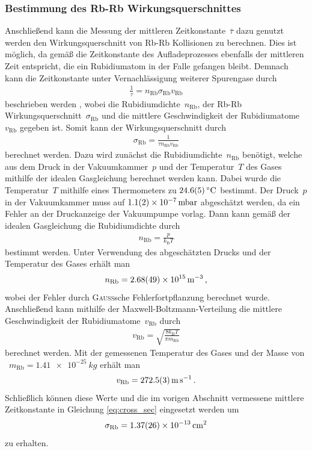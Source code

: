 \documentclass[11pt, a4paper]{article}
\numberwithin{equation}{section}
\begin{document}
\subsubsection{Bestimmung des Rb-Rb Wirkungsquerschnittes}
Anschließend kann die Messung der mittleren Zeitkonstante~$\bar{\tau}$ dazu genutzt werden den Wirkungsquerschnitt von Rb-Rb Kollisionen zu berechnen.
Dies ist möglich, da gemäß \cite{wieman} die Zeitkonstante des Aufladeprozesses ebenfalls der mittleren Zeit entspricht, die ein Rubidiumatom in der Falle gefangen bleibt.
Demnach kann die Zeitkonstante unter Vernachlässigung weiterer Spurengase durch 
\begin{align*}
	\frac{1}{\tau} = n_\mathrm{Rb}  \sigma_\mathrm{Rb}  v_\mathrm{Rb}
\end{align*}
beschrieben werden \cite{wieman}, wobei die Rubidiumdichte~$n_\mathrm{Rb}$, der Rb-Rb Wirkungsquerschnitt~$\sigma_\mathrm{Rb}$ und die mittlere Geschwindigkeit der Rubidiumatome~$v_\mathrm{Rb}$ gegeben ist.
Somit kann der Wirkungsquerschnitt durch
\begin{align}
	\sigma_\mathrm{Rb} = \frac{1}{\tau n_\mathrm{Rb} v_\mathrm{Rb}}
	\label{eq:cross_sec}
\end{align}
berechnet werden.
Dazu wird zunächst die Rubidiumdichte~$n_\mathrm{Rb}$ benötigt, welche aus dem Druck in der Vakuumkammer~$p$ und der Temperatur~$T$ des Gases mithilfe der idealen Gasgleichung berechnet werden kann.
Dabei wurde die Temperatur~$T$ mithilfe eines Thermometers zu $\SI{24.6 +- 0.5}{\degreeCelsius}$ bestimmt.
Der Druck~$p$ in der Vakuumkammer muss auf $\SI{1.1 +- 0.2e-7}{mbar}$ abgeschätzt werden, da ein Fehler an der Druckanzeige der Vakuumpumpe vorlag.
Dann kann gemäß der idealen Gasgleichung die Rubidiumdichte durch
\begin{align*}
	n_\mathrm{Rb} = \frac{p}{k_\mathrm{B} T}
\end{align*}
bestimmt werden.
Unter Verwendung des abgeschätzten Drucks und der Temperatur des Gases erhält man
\begin{align*}
	n_\mathrm{Rb} = \SI{2.68 +- 0.49e15}{\per\meter\cubed} \, \text{,}
\end{align*}
wobei der Fehler durch \textsc{Gauß}sche Fehlerfortpflanzung berechnet wurde.
Anschließend kann mithilfe der Maxwell-Boltzmann-Verteilung die mittlere Geschwindigkeit der Rubidiumatome~$v_\mathrm{Rb}$ durch
\begin{align*}
	v_\mathrm{Rb} = \sqrt{\frac{8 k_\mathrm{B} T}{\pi m_\mathrm{Rb}}} 
\end{align*}
berechnet werden.
Mit der gemessenen Temperatur des Gases und der Masse von ~$m_\mathrm{Rb} = \SI{1.41e-25}{kg}$ \cite{handbook_spectroscopic_data} erhält man
\begin{align*}
	v_\mathrm{Rb} = \SI{272.5 +- 0.3}{\meter\per\second} \, \text{.}
\end{align*}
Schließlich können diese Werte und die im vorigen Abschnitt vermessene mittlere Zeitkonstante in Gleichung \eqref{eq:cross_sec} eingesetzt werden um
\begin{align*}
	\sigma_\mathrm{Rb} &= \SI{1.37 +- 0.26e-13}{\centi\meter\squared}\\
\end{align*}
zu erhalten.
\end{document}
